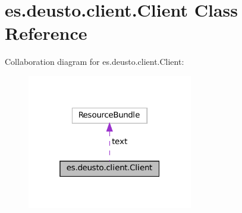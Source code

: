 \hypertarget{classes_1_1deusto_1_1client_1_1_client}{}\section{es.\+deusto.\+client.\+Client Class Reference}
\label{classes_1_1deusto_1_1client_1_1_client}


Collaboration diagram for es.\+deusto.\+client.\+Client\+:
\nopagebreak
\begin{figure}[H]
\begin{center}
\leavevmode
\includegraphics[width=205pt]{classes_1_1deusto_1_1client_1_1_client__coll__graph}
\end{center}
\end{figure}
